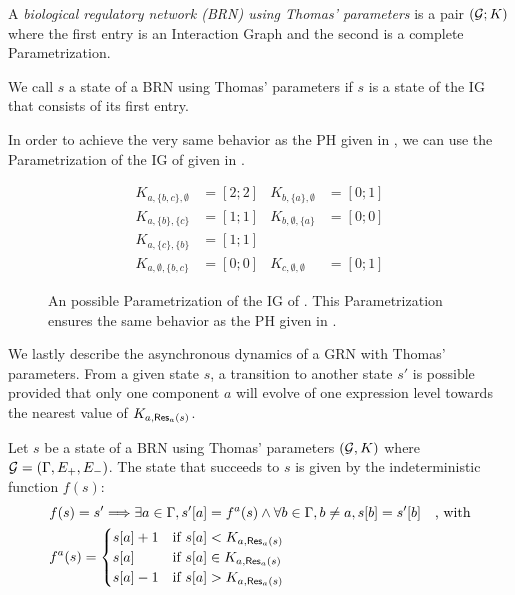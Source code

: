 \begin{definition}\label{def:brn}
A \emph{biological regulatory network (BRN) using Thomas' parameters} is a pair $(\mathcal{G}; K)$ where the first entry is an Interaction Graph and the second is a complete Parametrization.
\end{definition}
We call $s$ a state of a BRN using Thomas' parameters if $s$ is a state of the IG that consists of its first entry.

\begin{example*}
In order to achieve the very same behavior as the PH given in , we can use the Parametrization of the IG of  given in .

\begin{figure}[t]
\begin{align*}
K_{a,\{b,c\},\emptyset} &= [2 ; 2] & K_{b,\{a\},\emptyset} &= [0 ; 1] \\
K_{a,\{b\},\{c\}} &= [1 ; 1] & K_{b,\emptyset,\{a\}} &= [0 ; 0] \\
K_{a,\{c\},\{b\}} &= [1 ; 1] &&\\
K_{a,\emptyset,\{b,c\}} &= [0 ; 0] & K_{c,\emptyset,\emptyset} &= [0 ; 1]
\end{align*}
\caption{\label{fig:runningBRN-param}
An possible Parametrization of the IG of .
This Parametrization ensures the same behavior as the PH given in .
}
\end{figure}
\end{example*}

We lastly describe the asynchronous dynamics of a GRN with Thomas' parameters.
From a given state $s$, a transition to another state $s'$ is possible provided that only one component $a$ will evolve of one expression level towards the nearest value of $K_{a,\mathsf{Res}_{a}(s)}$.

\begin{definition}\label{def:dynamics}
Let $s$ be a state of a BRN using Thomas' parameters $(\mathcal{G}, K)$ where $\mathcal{G} = (\Gamma, E_+, E_-)$.
The state that succeeds to $s$ is given by the indeterministic function $f(s)$:
\begin{align*}
  & f(s) = s' \Longrightarrow \exists a \in \Gamma,
    {s'[a]} = f^a(s) \wedge
    \forall b \in \Gamma, b \neq a, {s[b]} = {s'[b]}
    \quad\text{, with}\\
  & f^a(s) =
  \begin{cases}
    {s[a]} + 1 & \text{if } {s[a]} < K_{a, \mathsf{Res}_{a}(s)} \\
    {s[a]} & \text{if } {s[a]} \in K_{a,\mathsf{Res}_{a}(s)}\\
    {s[a]} - 1 & \text{if } {s[a]} > K_{a,\mathsf{Res}_{a}(s)}
  \end{cases}
\end{align*}
\end{definition}

